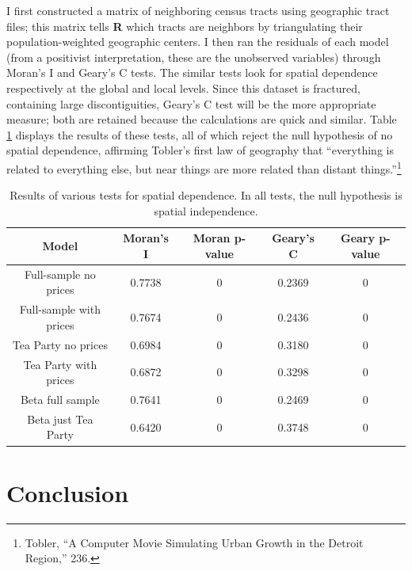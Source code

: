 \documentclass[12pt,oneside]{psthesis}
\begin{document}
I first constructed a matrix of neighboring census tracts using geographic tract files; this matrix tells \textbf{R} which tracts are neighbors by triangulating their population-weighted geographic centers.
I then ran the residuals of each model (from a positivist interpretation, these are the unobserved variables) through Moran's I and Geary's C tests.
The similar tests look for spatial dependence respectively at the global and local levels.
Since this dataset is fractured, containing large discontiguities, Geary's C test will be the more appropriate measure; both are retained because the calculations are quick and similar.
Table \ref{tab:spdep} displays the results of these tests, all of which reject the null hypothesis of no spatial dependence, affirming Tobler's first law of geography that ``everything is related to everything else, but near things are more related than distant things.''\footnote{Tobler, ``A Computer Movie Simulating Urban Growth in the Detroit Region,'' 236.}
\begin{table}

\caption{\label{tab:spdep}Results of various tests for spatial dependence. In all tests, the null hypothesis is spatial independence.}
\centering
\begin{tabular}[t]{ccccc}
\toprule
Model & Moran's I & Moran p-value & Geary's C & Geary p-value\\
\midrule
Full-sample no prices & 0.7738 & 0 & 0.2369 & 0\\
Full-sample with prices & 0.7674 & 0 & 0.2436 & 0\\
Tea Party no prices & 0.6984 & 0 & 0.3180 & 0\\
Tea Party with prices & 0.6872 & 0 & 0.3298 & 0\\
Beta full sample & 0.7641 & 0 & 0.2469 & 0\\
\addlinespace
Beta just Tea Party & 0.6420 & 0 & 0.3748 & 0\\
\bottomrule
\end{tabular}
\end{table}
\hypertarget{conclusion}{%
\section{Conclusion}\label{conclusion}}
\end{document}
